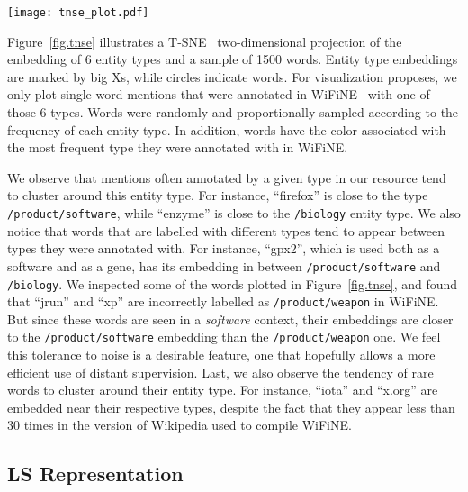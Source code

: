 \documentclass[11pt]{article}
\newcommand{\lr}{\textsc{LS}}
\newcommand{\wifine}{WiFiNE}
\begin{document}
	
	\begin{figure*}[h]
		\begin{center} 
			\texttt{[image: tnse\_plot.pdf]} 
			
			\caption{Two-dimensional representation of the vector space which embeds both words and entity types. Big Xs indicate entity types, while circles refer to words (i.e. named-entities, here).}
			
			\label{fig.tnse}
		\end{center}
	\end{figure*}
			
	Figure~\ref{fig.tnse} illustrates a T-SNE~\cite{tsne} two-dimensional projection of the embedding of 6 entity types and a sample of 1500 words. Entity type embeddings are marked by big Xs, while circles indicate words. For visualization proposes, we only plot single-word mentions that were annotated in \wifine{ } with one of those 6 types. Words were randomly and proportionally sampled according to the frequency of each entity type. In addition, words have the color associated with the most frequent type they were annotated with in \wifine.

		
	We observe that mentions often annotated by a given type in our resource tend to cluster around this entity type. For instance, \enquote{firefox} is close to the type \texttt{/product/software}, while \enquote{enzyme} is close to the \texttt{/biology} entity type. We also notice that words that are labelled with different types tend to appear between types they were annotated with. For instance,  \enquote{gpx2}, which is used both as a software and as a gene, has its embedding in between \texttt{/product/software} and \texttt{/biology}. 	
	We inspected some of the words plotted in Figure~\ref{fig.tnse}, and found that \enquote{jrun} and \enquote{xp} are incorrectly labelled as \texttt{/product/weapon} in \wifine. But since these words are seen in a \textit{software} context,  their embeddings are closer to the \texttt{/product/software} embedding than the \texttt{/product/weapon} one. We feel this tolerance to noise is a desirable feature, one that hopefully allows a more efficient use of distant supervision. 
	Last, we also observe the tendency of rare words to cluster around their entity type. For instance,  \enquote{iota} and \enquote{x.org} are embedded near their respective types, despite the fact that they appear less than 30 times in the version of Wikipedia used to compile \wifine.
	
\subsection{\lr{} Representation}
	
\end{document}
